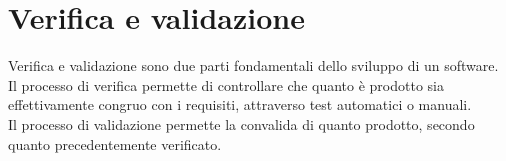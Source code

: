 \chapter{Verifica e validazione}
\label{cap:verifica-validazione}

Verifica e validazione sono due parti fondamentali dello sviluppo di un software.\\
Il processo di verifica permette di controllare che quanto è prodotto sia effettivamente congruo con i requisiti, attraverso test automatici o manuali.\\
Il processo di validazione permette la convalida di quanto prodotto, secondo quanto precedentemente verificato.
